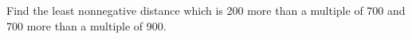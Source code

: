 Find the least nonnegative distance which is 200 more than a multiple of 700 and 700 more than a multiple of 900.
